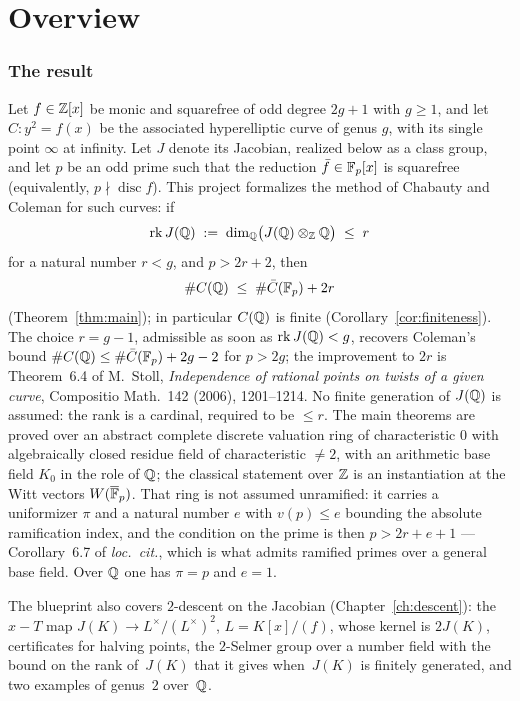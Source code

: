\chapter*{Overview}

\subsection*{The result}

Let $f \in \mathbb{Z}[x]$ be monic and squarefree of odd degree $2g+1$ with $g \ge 1$, and let
$C \colon y^2 = f(x)$ be the associated hyperelliptic curve of genus $g$, with its single
point $\infty$ at infinity. Let $J$ denote its Jacobian, realized below as a class group,
and let $p$ be an odd prime such that the reduction $\bar f \in \mathbb{F}_p[x]$ is squarefree
(equivalently, $p \nmid \operatorname{disc} f$). This project formalizes the
method of Chabauty and Coleman for such curves: if
\[
  \operatorname{rk} J(\mathbb{Q}) \;:=\; \dim_{\mathbb{Q}} \bigl(J(\mathbb{Q}) \otimes_{\mathbb{Z}} \mathbb{Q}\bigr) \;\le\; r
\]
for a natural number $r < g$, and $p > 2r + 2$, then
\[
  \#C(\mathbb{Q}) \;\le\; \#\bar C(\mathbb{F}_p) + 2r
\]
(Theorem~\ref{thm:main}); in particular $C(\mathbb{Q})$ is finite
(Corollary~\ref{cor:finiteness}). The choice $r = g-1$, admissible as soon as
$\operatorname{rk} J(\mathbb{Q}) < g$, recovers Coleman's bound
$\#C(\mathbb{Q}) \le \#\bar C(\mathbb{F}_p) + 2g-2$ for $p > 2g$; the improvement to $2r$ is Theorem~6.4
of M.~Stoll, \emph{Independence of rational points on twists of a given curve}, Compositio
Math.\ 142 (2006), 1201--1214. No finite generation of $J(\mathbb{Q})$ is assumed: the rank is
a cardinal, required to be $\le r$. The main theorems are proved over an abstract complete
discrete valuation ring of characteristic $0$ with algebraically closed residue field of
characteristic $\neq 2$, with an arithmetic base field $K_0$ in the role of $\mathbb{Q}$; the
classical statement over $\mathbb{Z}$ is an instantiation at the Witt vectors $W(\overline{\mathbb{F}}_p)$. That
ring is not assumed unramified: it carries a uniformizer $\pi$ and a natural number $e$
with $v(p) \le e$ bounding the absolute ramification index, and the condition on the prime
is then $p > 2r + e + 1$ --- Corollary~6.7 of \emph{loc.\ cit.}, which is what admits
ramified primes over a general base field. Over $\mathbb{Q}$ one has $\pi = p$ and $e = 1$.

The blueprint also covers $2$-descent on the Jacobian (Chapter~\ref{ch:descent}): the $x - T$ map
$J(K) \to L^\times/(L^\times)^2$, $L = K[x]/(f)$, whose kernel is $2J(K)$, certificates for halving
points, the $2$-Selmer group over a number field with the bound on the rank of~$J(K)$ that it
gives when~$J(K)$ is finitely generated, and two examples of genus~$2$ over~$\mathbb{Q}$.

